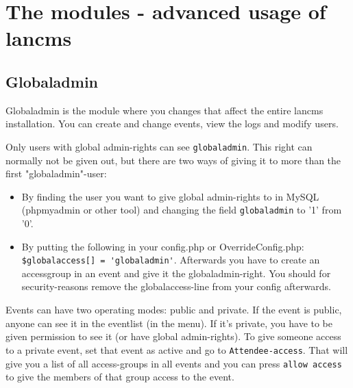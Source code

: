 \chapter{The modules - advanced usage of lancms}

\section{Globaladmin}

Globaladmin is the module where you changes that affect the entire lancms
installation. You can create and change events, view the logs and modify
users.

Only users with global admin-rights can see \lstinline!globaladmin!. This
right can normally not be given out, but there are two ways of giving it to
more than the first "globaladmin"-user:
\begin{itemize}
\item By finding the user you want to give global admin-rights to in MySQL
(phpmyadmin or other tool) and changing the field \lstinline!globaladmin! to
'1' from '0'.
\item By putting the following in your config.php or OverrideConfig.php:
\lstinline;$globalaccess[] = 'globaladmin';. Afterwards you have to create an
accessgroup in an event and give it the globaladmin-right. You should for
security-reasons remove the globalaccess-line from your config afterwards.
\end{itemize}

Events can have two operating modes: public and private. If the event is
public, anyone can see it in the eventlist (in the menu). If it's private, you
have to be given permission to see it (or have global admin-rights). To give
someone access to a private event, set that event as active and go to
\lstinline!Attendee-access!. That will give you a list of all access-groups in
all events and you can press \lstinline!allow access! to give the members of
that group access to the event.

